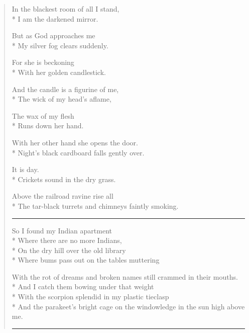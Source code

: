 \documentclass[english,11pt,letterpaper,onecolumn]{scrbook}
\begin{document}
\begin{verse}

In the blackest room of all I stand, \\*
I am the darkened mirror.



But as God approaches me \\*
My silver fog clears suddenly.



For she is beckoning \\*
With her golden candlestick.



And the candle is a figurine of me, \\*
The wick of my head's aflame,



The wax of my flesh  \\*
Runs down her hand.



With her other hand she opens the door. \\*
Night's black cardboard falls gently over.



It is day. \\*
Crickets sound in the dry grass.



Above the railroad ravine rise all \\*
The tar-black turrets and chimneys faintly smoking.


\begin{center}\rule[3pt]{2in}{0.5pt}\end{center}


So I found my Indian apartment \\*
Where there are no more Indians, \\*
On the dry hill over the old library \\*
Where bums pass out on the tables muttering



With the rot of dreams and broken names still crammed in their mouths. \\*
And I catch them bowing under that weight \\*
With the scorpion splendid in my plastic tieclasp \\*
And the parakeet's bright cage on the windowledge in the sun high above me.


\begin{center}\rule[3pt]{2in}{0.5pt}\end{center}



\end{verse}
\end{document}
